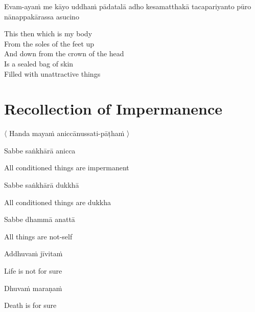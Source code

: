 \begin{pali-hang}
Evam-ayaṁ me kāyo uddhaṁ pādatalā adho kesamatthakā tacapariyanto pūro nānappakārassa asucino
\end{pali-hang}

\begin{english-verses}
  This then which is my body\\
  From the soles of the feet up\\
  And down from the crown of the head\\
  Is a sealed bag of skin\\
  Filled with unattractive things
\end{english-verses}



\suttaRef{[DN 22]}


\section{Recollection of Impermanence}
\label{recollection-impermanence}

\begin{leader}
  〈 Handa mayaṁ aniccānussati-pāṭhaṁ 〉
\end{leader}

Sabbe saṅkhārā anicca

\begin{english}
  All conditioned things are impermanent
\end{english}

Sabbe saṅkhārā dukkhā

\begin{english}
  All conditioned things are dukkha
\end{english}

Sabbe dhammā anattā

\begin{english}
  All things are not-self
\end{english}

\suttaRef{[Dhp 277-279]}

Addhuvaṁ jīvitaṁ

\begin{english}
  Life is not for sure
\end{english}

Dhuvaṁ maraṇaṁ

\begin{english}
  Death is for sure
\end{english}

